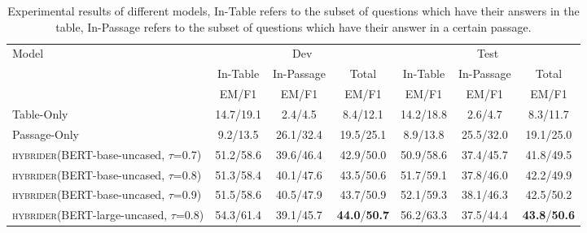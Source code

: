 \documentclass[11pt,a4paper]{article}
\newcommand{\model}{\textsc{hybrider}\xspace}
\begin{document}
\begin{table*}[!th]
\small
\begin{tabular}{l|ccc|ccc}
\hline
\multicolumn{1}{l|}{\multirow{3}{*}{Model}} & \multicolumn{3}{c|}{Dev} & \multicolumn{3}{c}{Test}    \\ 
\cline{2-7} 
\multicolumn{1}{l|}{}                      & \multicolumn{1}{c}{In-Table} & \multicolumn{1}{c}{In-Passage} & \multicolumn{1}{c|}{Total} & \multicolumn{1}{c}{In-Table} & \multicolumn{1}{c}{In-Passage} & \multicolumn{1}{c}{Total}   \\
\cline{2-7}
\multicolumn{1}{l|}{}                       & EM/F1   & EM/F1 & EM/F1    & EM/F1       & EM/F1 & EM/F1   \\ 
\hline
Table-Only                                  & 14.7/19.1  & 2.4/4.5          & 8.4/12.1   & 14.2/18.8  &  2.6/4.7    & 8.3/11.7 \\
Passage-Only                                & 9.2/13.5   & 26.1/32.4        & 19.5/25.1  &  8.9/13.8  &   25.5/32.0 & 19.1/25.0 \\ 
\hline
\model (BERT-base-uncased, $\tau$=0.7)      & 51.2/58.6  & 39.6/46.4   & 42.9/50.0     &  50.9/58.6   & 37.4/45.7  & 41.8/49.5      \\
\model (BERT-base-uncased, $\tau$=0.8)      & 51.3/58.4 & 40.1/47.6 & 43.5/50.6 & 51.7/59.1 & 37.8/46.0  & 42.2/49.9 \\
\model (BERT-base-uncased, $\tau$=0.9)      & 51.5/58.6 & 40.5/47.9    & 43.7/50.9  &  52.1/59.3  & 38.1/46.3  & 42.5/50.2   \\
\model (BERT-large-uncased, $\tau$=0.8)     & 54.3/61.4  &  39.1/45.7  &  \textbf{44.0}/\textbf{50.7}  & 56.2/63.3 & 37.5/44.4  & \textbf{43.8}/\textbf{50.6}   \\
\hline
\end{tabular}
\caption{Experimental results of different models, In-Table refers to the subset of questions which have their answers in the table, In-Passage refers to the subset of questions which have their answer in a certain passage.}
\label{tab:results}
\vspace{-2ex}
\end{table*}
\end{document}
